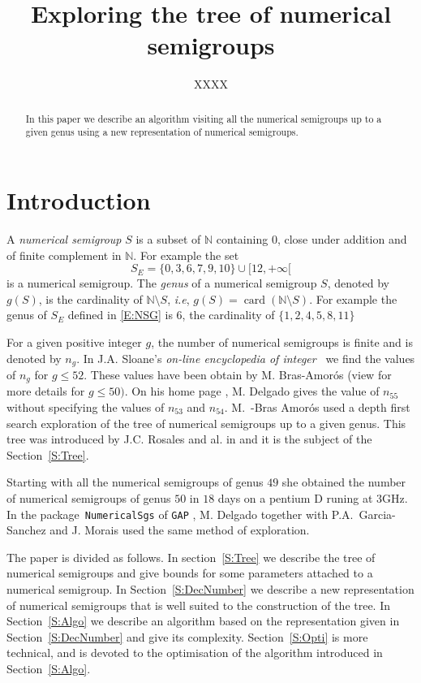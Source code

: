 \documentclass[reqno,11pt]{amsart}
\title{Exploring the tree of numerical semigroups}
\author{XXXX}
\theoremstyle{plain}
\theoremstyle{definition}
\newcommand{\ie}{\emph{i.e.}}
\renewcommand{\leq}{\leqslant}
\newcommand{\NN}{\mathbb{N}}
\renewcommand{\tt}[1]{\texttt{#1}}
\renewcommand{\ie}{\emph{i.e}}
\DeclareMathOperator{\card}{card}
\begin{document}
\begin{abstract}
In this paper we describe an algorithm visiting all the numerical semigroups up to a given genus using a new representation of numerical semigroups. 
\end{abstract}

\maketitle

\section{Introduction}

A \emph{numerical semigroup} $S$ is a subset of $\NN$ containing $0$, close under addition and of finite complement in $\NN$.  
For example the set 
\begin{equation}
\label{E:NSG}
S_E=\{0,3,6,7,9,10\}\cup[12,+\infty[
\end{equation}
is a numerical semigroup.
The \emph{genus} of a numerical semigroup $S$, denoted by~$g(S)$, is the cardinality of $\NN\setminus S$, \ie, $g(S)=\card(\NN\setminus S)$. 
 For example the genus of $S_E$ defined in \eqref{E:NSG} is $6$,  the cardinality of $\{1,2,4,5,8,11\}$

For a given positive integer $g$, the number of numerical semigroups  is finite and is denoted by $n_g$. 
In  J.A. Sloane's \emph{on-line encyclopedia of integer}~\cite{OEIS} we find the values of $n_g$ for $g\leq 52$. 
These values have been obtain by M. Bras-Amor\'os (view \cite{BrasAmoros2008} for more details for $g\leq 50)$. 
On his home page \cite{Delgado}, M. Delgado  gives the value of $n_{55}$ without specifying the values of $n_{53}$ and $n_{54}$. 
M.~-Bras Amor\'os used a depth first search exploration of the tree of numerical semigroups up to a given genus.
This tree was introduced by J.C. Rosales and al. in \cite{Rosales} and it is the subject of the Section~\ref{S:Tree}.

Starting with all the numerical semigroups of genus $49$ she obtained the number of numerical semigroups of genus $50$ in $18$ days on a pentium D runing at $3$GHz. 
In the package~\tt{NumericalSgs} \cite{NumericalSgps} of \tt{GAP} \cite{GAP}, M. Delgado together with P.A.~Garcia-Sanchez and J. Morais used the same method of exploration.

The paper is divided as follows.
In section~\ref{S:Tree} we describe the tree of numerical semigroups and give bounds for some parameters attached to a numerical semigroup.
In Section~\ref{S:DecNumber} we describe a new representation of numerical semigroups that is well suited to the construction of the tree. 
In Section~\ref{S:Algo} we describe an algorithm based on the representation given in Section~\ref{S:DecNumber} and give its complexity. 
Section~\ref{S:Opti} is more technical, and is devoted to the optimisation of the algorithm introduced in Section~\ref{S:Algo}.
\end{document}
